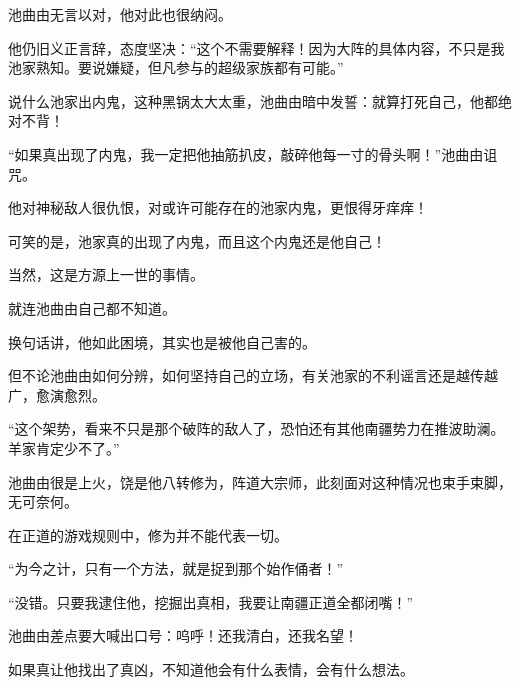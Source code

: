 \begin{this_body}
池曲由无言以对，他对此也很纳闷。

他仍旧义正言辞，态度坚决：“这个不需要解释！因为大阵的具体内容，不只是我池家熟知。要说嫌疑，但凡参与的超级家族都有可能。”

说什么池家出内鬼，这种黑锅太大太重，池曲由暗中发誓：就算打死自己，他都绝对不背！

“如果真出现了内鬼，我一定把他抽筋扒皮，敲碎他每一寸的骨头啊！”池曲由诅咒。

他对神秘敌人很仇恨，对或许可能存在的池家内鬼，更恨得牙痒痒！

可笑的是，池家真的出现了内鬼，而且这个内鬼还是他自己！

当然，这是方源上一世的事情。

就连池曲由自己都不知道。

换句话讲，他如此困境，其实也是被他自己害的。

但不论池曲由如何分辨，如何坚持自己的立场，有关池家的不利谣言还是越传越广，愈演愈烈。

“这个架势，看来不只是那个破阵的敌人了，恐怕还有其他南疆势力在推波助澜。羊家肯定少不了。”

池曲由很是上火，饶是他八转修为，阵道大宗师，此刻面对这种情况也束手束脚，无可奈何。

在正道的游戏规则中，修为并不能代表一切。

“为今之计，只有一个方法，就是捉到那个始作俑者！”

“没错。只要我逮住他，挖掘出真相，我要让南疆正道全都闭嘴！”

池曲由差点要大喊出口号：呜呼！还我清白，还我名望！

如果真让他找出了真凶，不知道他会有什么表情，会有什么想法。

\end{this_body}

